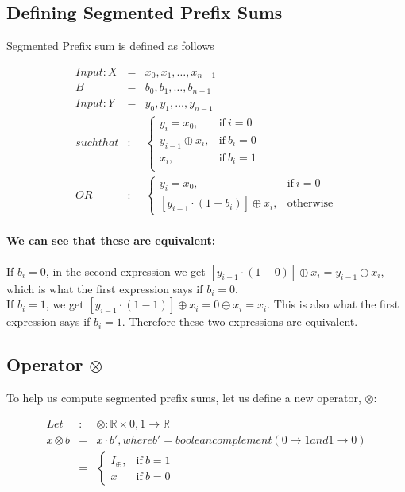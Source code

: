 \documentclass[11pt]{article}
\begin{document}
\subsection{Defining Segmented Prefix Sums}

Segmented Prefix sum is defined as follows

  \begin{eqnarray*}
    Input: X &=& {x_0, x_1, \dots , x_{n-1}}\\
    B &=& {b_0, b_1, \dots , b_{n-1}}\\
    Input: Y &=& {y_0, y_1, \dots , y_{n-1}}\\
    such that&:&
    \begin{cases}
      y_i = x_0, & \text{if}\ i = 0 \\
      y_{i-1} \oplus x_i, & \text{if}\ b_i = 0 \\
      x_i, & \text{if}\ b_i = 1 \\
    \end{cases}
    \\OR &:&
    \begin{cases}
      y_i = x_0, & \text{if}\ i = 0 \\
      [y_{i-1} \cdot (1 - b_i) ] \oplus x_i, & \text{otherwise}
    \end{cases}
  \end{eqnarray*}

\paragraph{We can see that these are equivalent:} 

If $b_i = 0$, in the second expression we get $[y_{i-1} \cdot (1-0)] \oplus x_i = y_{i-1} \oplus x_i$, which is what the first expression says if $b_i = 0$.\\
If $b_i = 1$, we get $[y_{i-1} \cdot (1 - 1)] \oplus x_i = 0 \oplus x_i = x_i$. This is also what the first expression says if $b_i = 1$. Therefore these two expressions are equivalent.

\subsection{Operator $\otimes$} 
To help us compute segmented prefix sums, let us define a new operator, $\otimes$:

  \begin{eqnarray*}
    Let&:& \otimes: \mathbb{R} \times {0, 1} \longrightarrow \mathbb{R}\\
    x \otimes b &=& x \cdot b', where b' = boolean complement (0 \longrightarrow 1 and 1 \longrightarrow 0)\\
    &=&
    \begin{cases}
      I_\oplus, & \text{if}\ b = 1 \\
      x & \text{if}\ b = 0
    \end{cases}
  \end{eqnarray*}
\end{document}
